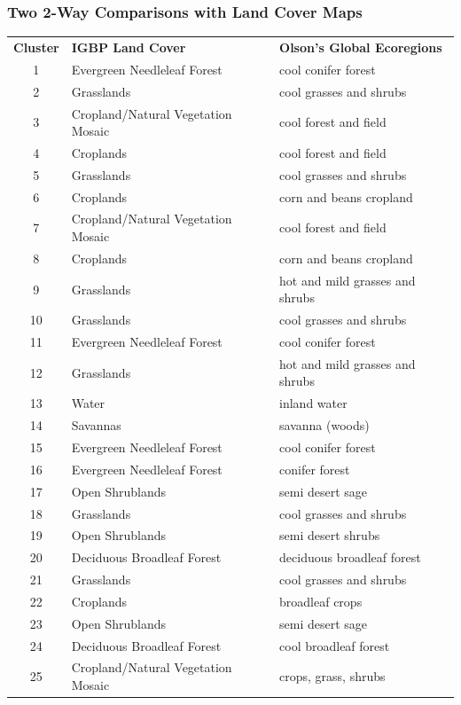 \begin{frame}
   \frametitle{Two 2-Way Comparisons with Land Cover Maps}
   \tiny 
    \begin{tabular}{cll}
      \textbf{Cluster} & \textbf{IGBP Land Cover} & \textbf{Olson's Global Ecoregions} \\
1 & Evergreen Needleleaf Forest & cool conifer forest \\
2 & Grasslands & cool grasses and shrubs \\
3 & Cropland/Natural Vegetation Mosaic & cool forest and field \\
4 & Croplands & cool forest and field \\
5 & Grasslands & cool grasses and shrubs \\
6 & Croplands & corn and beans cropland \\
7 & Cropland/Natural Vegetation Mosaic & cool forest and field \\
8 & Croplands & corn and beans cropland \\
9 & Grasslands & hot and mild grasses and shrubs \\
10 & Grasslands & cool grasses and shrubs \\
11 & Evergreen Needleleaf Forest & cool conifer forest \\
12 & Grasslands & hot and mild grasses and shrubs \\
13 & Water & inland water \\
14 & Savannas & savanna (woods) \\
15 & Evergreen Needleleaf Forest & cool conifer forest \\
16 & Evergreen Needleleaf Forest & conifer forest \\
17 & Open Shrublands & semi desert sage \\
18 & Grasslands & cool grasses and shrubs \\
19 & Open Shrublands & semi desert shrubs \\
20 & Deciduous Broadleaf Forest & deciduous broadleaf forest \\
21 & Grasslands & cool grasses and shrubs \\
22 & Croplands & broadleaf crops \\
23 & Open Shrublands & semi desert sage \\
24 & Deciduous Broadleaf Forest & cool broadleaf forest \\
25 & Cropland/Natural Vegetation Mosaic & crops, grass, shrubs \\
    \end{tabular}
\end{frame}

